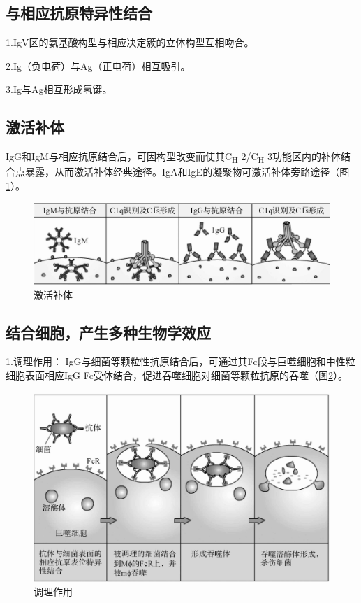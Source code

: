 \subsection{与相应抗原特异性结合}

1.IgV区的氨基酸构型与相应决定簇的立体构型互相吻合。

2.Ig（负电荷）与Ag（正电荷）相互吸引。

3.Ig与Ag相互形成氢键。


\subsection{激活补体}

IgG和IgM与相应抗原结合后，可因构型改变而使其C\textsubscript{H}
2/C\textsubscript{H}
3功能区内的补体结合点暴露，从而激活补体经典途径。IgA和IgE的凝聚物可激活补体旁路途径（图\ref{fig4-6}）。

\begin{figure}[!htbp]
 \centering
 \includegraphics{./images/Image00066.jpg}
 \captionsetup{justification=centering}
 \caption{激活补体}
 \label{fig4-6}
  \end{figure} 


\subsection{结合细胞，产生多种生物学效应}

1.调理作用：
IgG与细菌等颗粒性抗原结合后，可通过其Fc段与巨噬细胞和中性粒细胞表面相应IgG
Fc受体结合，促进吞噬细胞对细菌等颗粒抗原的吞噬（图\ref{fig4-7}）。

\begin{figure}[!htbp]
 \centering
 \includegraphics{./images/Image00067.jpg}
 \captionsetup{justification=centering}
 \caption{调理作用}
 \label{fig4-7}
  \end{figure} 

